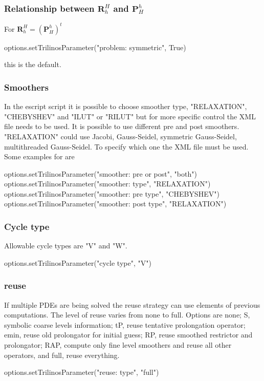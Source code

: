 \subsubsection{Relationship between $\mathbf{R}_h^H$  and $\mathbf{P}^h_H$}
For $\mathbf{R}_h^H=(\mathbf{P}^h_H)^t$
\begin{python}
options.setTrilinosParameter("problem: symmetric", True)
\end{python}
this is the default.

\subsubsection{Smoothers}
In the escript script it is possible to choose smoother type, "RELAXATION", "CHEBYSHEV" and "ILUT" or "RILUT" but for more specific control the XML file needs to be used.  It is possible to use different pre and post smoothers.  "RELAXATION" could use Jacobi, Gauss-Seidel, symmetric Gauss-Seidel, multithreaded Gauss-Seidel.  To specify which one the XML file must be used.  Some examples for are 
\begin{python}
options.setTrilinosParameter("smoother: pre or post", "both")
options.setTrilinosParameter("smoother: type", "RELAXATION")
options.setTrilinosParameter("smoother: pre type", "CHEBYSHEV")
options.setTrilinosParameter("smoother: post type", "RELAXATION")
\end{python}

\subsubsection{Cycle type}
Allowable cycle types are "V" and "W".  
\begin{python}
options.setTrilinosParameter("cycle type", "V")
\end{python}

\subsubsection{reuse}
If multiple PDEs are being solved the reuse strategy can use elements of previous computations.  The level of reuse varies from none to full.  Options are none; S, symbolic coarse levels information; tP, reuse tentative prolongation operator; emin, reuse old prolongator for initial guess; RP, reuse smoothed restrictor and prolongator; RAP, compute only fine level smoothers and reuse all other operators, and full, reuse everything.
\begin{python}
options.setTrilinosParameter("reuse: type", "full")
\end{python}


